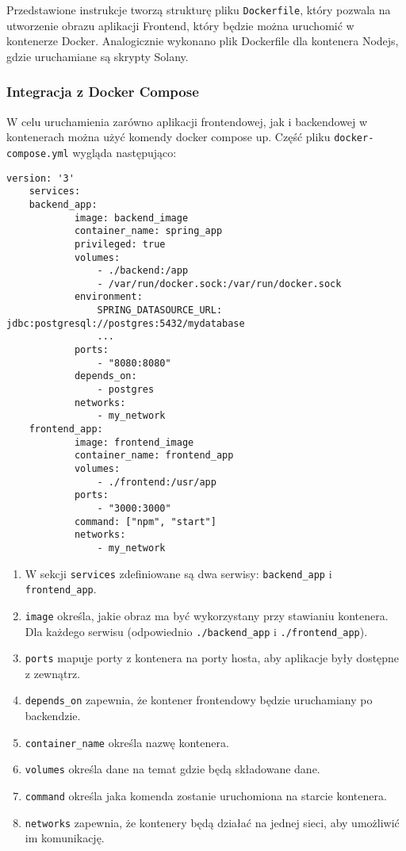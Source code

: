 Przedstawione instrukcje tworzą strukturę pliku \texttt{Dockerfile}, który pozwala na utworzenie obrazu aplikacji Frontend, który będzie można uruchomić w kontenerze Docker. Analogicznie wykonano plik Dockerfile dla kontenera Nodejs, gdzie uruchamiane są skrypty Solany.

\subsubsection{Integracja z Docker Compose}
W celu uruchamienia zarówno aplikacji frontendowej, jak i backendowej w kontenerach można użyć komendy docker compose up. Część pliku \texttt{docker-compose.yml} wygląda następująco:

\begin{lstlisting}
version: '3'
	services:
    backend_app:
			image: backend_image
			container_name: spring_app
			privileged: true
			volumes:
				- ./backend:/app
				- /var/run/docker.sock:/var/run/docker.sock
			environment:
				SPRING_DATASOURCE_URL: jdbc:postgresql://postgres:5432/mydatabase
				...
			ports:
				- "8080:8080"
			depends_on:
				- postgres
			networks:
				- my_network
    frontend_app:
			image: frontend_image
			container_name: frontend_app
			volumes:
				- ./frontend:/usr/app
			ports:
				- "3000:3000"
			command: ["npm", "start"]
			networks:
				- my_network
\end{lstlisting}

\begin{enumerate}
    \item W sekcji \texttt{services} zdefiniowane są dwa serwisy: \texttt{backend\_app} i \texttt{frontend\_app}.
    \item \texttt{image} określa, jakie obraz ma być wykorzystany przy stawianiu kontenera. Dla każdego serwisu (odpowiednio \texttt{./backend\_app} i \texttt{./frontend\_app}).
    \item \texttt{ports} mapuje porty z kontenera na porty hosta, aby aplikacje były dostępne z zewnątrz.
    \item \texttt{depends\_on} zapewnia, że kontener frontendowy będzie uruchamiany po backendzie.
		\item \texttt{container\_name} określa nazwę kontenera.
		\item \texttt{volumes} określa dane na temat gdzie będą składowane dane.
		\item \texttt{command} określa jaka komenda zostanie uruchomiona na starcie kontenera.
		\item \texttt{networks} zapewnia, że kontenery będą działać na jednej sieci, aby umożliwić im komunikację.
\end{enumerate}

